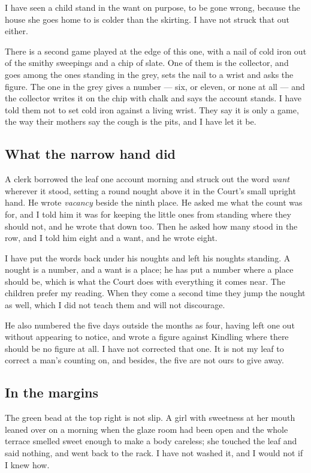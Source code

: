 \documentclass{design/chronicle}
\begin{document}
I have seen a child stand in the want on purpose, to be gone wrong, because the house she goes home to is colder than the skirting. I have not struck that out either.

There is a second game played at the edge of this one, with a nail of cold iron out of the smithy sweepings and a chip of slate. One of them is the collector, and goes among the ones standing in the grey, sets the nail to a wrist and asks the figure. The one in the grey gives a number — six, or eleven, or none at all — and the collector writes it on the chip with chalk and says the account stands. I have told them not to set cold iron against a living wrist. They say it is only a game, the way their mothers say the cough is the pits, and I have let it be.

\subsection*{What the narrow hand did}

A clerk borrowed the leaf one account morning and struck out the word \emph{want} wherever it stood, setting a round nought above it in the Court’s small upright hand. He wrote \emph{vacancy} beside the ninth place. He asked me what the count was for, and I told him it was for keeping the little ones from standing where they should not, and he wrote that down too. Then he asked how many stood in the row, and I told him eight and a want, and he wrote eight.

I have put the words back under his noughts and left his noughts standing. A nought is a number, and a want is a place; he has put a number where a place should be, which is what the Court does with everything it comes near. The children prefer my reading. When they come a second time they jump the nought as well, which I did not teach them and will not discourage.

He also numbered the five days outside the months as four, having left one out without appearing to notice, and wrote a figure against Kindling where there should be no figure at all. I have not corrected that one. It is not my leaf to correct a man’s counting on, and besides, the five are not ours to give away.

\subsection*{In the margins}

The green bead at the top right is not slip. A girl with sweetness at her mouth leaned over on a morning when the glaze room had been open and the whole terrace smelled sweet enough to make a body careless; she touched the leaf and said nothing, and went back to the rack. I have not washed it, and I would not if I knew how.
\end{document}
